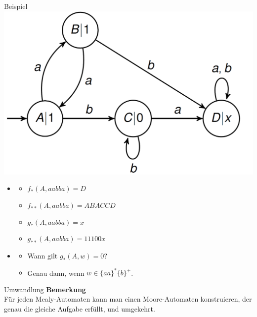 \documentclass[handout]{beamer}
\begin{document}
\begin{frame}{Beispiel}
	\includegraphics[scale=0.3]{images/Moore.png}
	\begin{itemize}
		\item<1|only@1>[] {
			\begin{itemize}
				\item \(f_* (A, aabba) = D\)
				\item \(f_{**} (A, aabba) = ABACCD\)
				\item \(g_* (A, aabba) = x\)
				\item \(g_{**} (A, aabba) = 11100x\)		
			\end{itemize}
		}
		\item<2-3|only@2-3>[] {
			\begin{itemize}
				\item[] Wann gilt \(g_* (A, w) = 0\)? \pause \pause
				\item[] Genau dann, wenn \(w \in \{aa\}^* \{b\}^+\).
			\end{itemize}
		}
	\end{itemize}
\end{frame}

\begin{frame}{Umwandlung}
	\textbf{Bemerkung}\\
	Für jeden Mealy-Automaten kann man einen Moore-Automaten konstruieren, der genau die gleiche Aufgabe erfüllt, und umgekehrt.
\end{frame}
\end{document}
